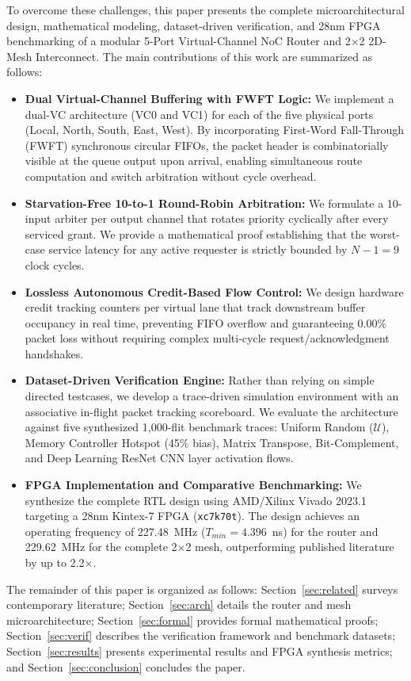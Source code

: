 \documentclass[conference]{IEEEtran}
\begin{document}
To overcome these challenges, this paper presents the complete microarchitectural design, mathematical modeling, dataset-driven verification, and 28nm FPGA benchmarking of a modular 5-Port Virtual-Channel NoC Router and 2$\times$2 2D-Mesh Interconnect. The main contributions of this work are summarized as follows:
\begin{itemize}
    \item \textbf{Dual Virtual-Channel Buffering with FWFT Logic:} We implement a dual-VC architecture (VC0 and VC1) for each of the five physical ports (Local, North, South, East, West). By incorporating First-Word Fall-Through (FWFT) synchronous circular FIFOs, the packet header is combinatorially visible at the queue output upon arrival, enabling simultaneous route computation and switch arbitration without cycle overhead.
    \item \textbf{Starvation-Free 10-to-1 Round-Robin Arbitration:} We formulate a 10-input arbiter per output channel that rotates priority cyclically after every serviced grant. We provide a mathematical proof establishing that the worst-case service latency for any active requester is strictly bounded by $N-1 = 9$ clock cycles.
    \item \textbf{Lossless Autonomous Credit-Based Flow Control:} We design hardware credit tracking counters per virtual lane that track downstream buffer occupancy in real time, preventing FIFO overflow and guaranteeing 0.00\% packet loss without requiring complex multi-cycle request/acknowledgment handshakes.
    \item \textbf{Dataset-Driven Verification Engine:} Rather than relying on simple directed testcases, we develop a trace-driven simulation environment with an associative in-flight packet tracking scoreboard. We evaluate the architecture against five synthesized 1,000-flit benchmark traces: Uniform Random ($\mathcal{U}$), Memory Controller Hotspot (45\% bias), Matrix Transpose, Bit-Complement, and Deep Learning ResNet CNN layer activation flows.
    \item \textbf{FPGA Implementation and Comparative Benchmarking:} We synthesize the complete RTL design using AMD/Xilinx Vivado 2023.1 targeting a 28nm Kintex-7 FPGA (\texttt{xc7k70t}). The design achieves an operating frequency of 227.48~MHz ($T_{min} = 4.396$~ns) for the router and 229.62~MHz for the complete 2$\times$2 mesh, outperforming published literature by up to 2.2$\times$.
\end{itemize}

The remainder of this paper is organized as follows: Section~\ref{sec:related} surveys contemporary literature; Section~\ref{sec:arch} details the router and mesh microarchitecture; Section~\ref{sec:formal} provides formal mathematical proofs; Section~\ref{sec:verif} describes the verification framework and benchmark datasets; Section~\ref{sec:results} presents experimental results and FPGA synthesis metrics; and Section~\ref{sec:conclusion} concludes the paper.
\end{document}
